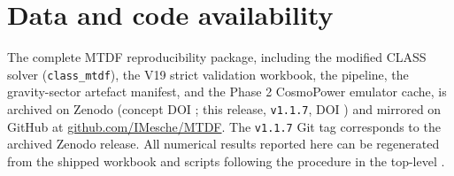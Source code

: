 \documentclass[11pt,a4paper]{article}
\begin{document}
\section{Data and code availability}
The complete MTDF reproducibility package, including the modified CLASS solver
(\texttt{class\_\allowbreak{}mtdf}), the V19 strict validation workbook, the
\texttt{{\small\protect{}}} pipeline, the gravity-sector artefact manifest,
and the Phase 2 CosmoPower emulator cache, is archived on Zenodo
(concept DOI \href{https://doi.org/10.5281/zenodo.19741058}{{\small\protect{}}};
this release, \texttt{v1.1.7}, DOI
\href{https://doi.org/10.5281/zenodo.21525855}{{\small\protect{}}})
and mirrored on GitHub at
\href{https://github.com/IMesche/MTDF}{github.com/\allowbreak{}IMesche/\allowbreak{}MTDF}.
The \texttt{v1.1.7} Git tag corresponds to the archived Zenodo release. All
numerical results reported here can be regenerated from the shipped workbook
and scripts following the procedure in the top-level \texttt{{\small\protect{}}}.
\end{document}
